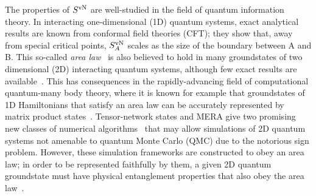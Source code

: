 \documentclass[prl,aps,twocolumn,floatfix,amsmath,amssymb,superscriptaddress,tightenlines]{revtex4}
\begin{document}
The properties of $S^{ \rm vN}$ are well-studied in the field of quantum information theory.
In interacting one-dimensional (1D) quantum systems, exact analytical results are known from conformal
field theories (CFT); they show that, away from special critical points,
$S^{ \rm vN}_A$ scales as the size of the boundary between A and B.
This so-called {\it area law}~\cite{Shredder} is also believed to hold in many
groundstates of two dimensional (2D) interacting quantum systems,
although few exact results are available~\cite{ALreview}.  This has 
consequences in the
rapidly-advancing field of computational quantum-many body theory, where
it is known for example that groundstates of 1D Hamiltonians that satisfy an area law
can be accurately represented by matrix product states~\cite{MPS_DMRG}.
Tensor-network states and MERA give two promising new classes of numerical
algorithms~\cite{PEPS1} 
that may allow simulations of 2D quantum systems not amenable to quantum Monte Carlo (QMC) due to
the notorious sign problem.  However, 
these simulation frameworks
are constructed to obey an area law; in order to be represented faithfully
by them, a given 2D quantum groundstate must have physical entanglement
properties that also obey the area law~\cite{ALreview}.


\end{document}
